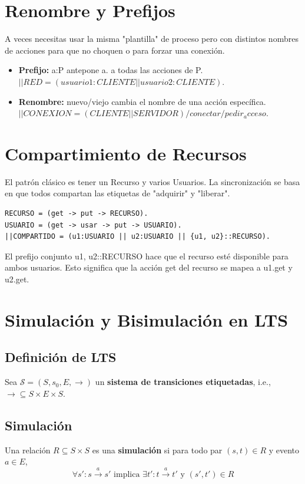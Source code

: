 \documentclass[11pt,a4paper]{article}
\begin{document}
\section{Renombre y Prefijos}
A veces necesitas usar la misma "plantilla" de proceso pero con distintos nombres de acciones para que no choquen o para forzar una conexión.
\begin{itemize}
    \item \textbf{Prefijo:} a:P antepone a. a todas las acciones de P. $||RED = (usuario1:CLIENTE || usuario2:CLIENTE)$.
    \item \textbf{Renombre:} nuevo/viejo cambia el nombre de una acción específica. $||CONEXION = (CLIENTE || SERVIDOR) / {conectar/pedir_acceso}$.
\end{itemize}

\section{Compartimiento de Recursos}
El patrón clásico es tener un Recurso y varios Usuarios. La sincronización se basa en que todos compartan las etiquetas de "adquirir" y "liberar".
\begin{lstlisting}
RECURSO = (get -> put -> RECURSO).
USUARIO = (get -> usar -> put -> USUARIO).
||COMPARTIDO = (u1:USUARIO || u2:USUARIO || {u1, u2}::RECURSO).
\end{lstlisting}

\begin{tcolorbox}[title=Nota sobre el operador ::]
El prefijo conjunto {u1, u2}::RECURSO hace que el recurso esté disponible para ambos usuarios. Esto significa que la acción get del recurso se mapea a u1.get y u2.get.
\end{tcolorbox}

\section{Simulación y Bisimulación en LTS}

\subsection{Definición de LTS}
Sea $\mathcal{S} = (S, s_0, E, \rightarrow)$ un \textbf{sistema de transiciones etiquetadas}, i.e., $\rightarrow \subseteq S \times E \times S$.

\subsection{Simulación}
Una relación $R \subseteq S \times S$ es una \textbf{simulación} si para todo par $(s, t) \in R$ y evento $a \in E$,
\[ \forall s' : s \xrightarrow{a} s' \text{ implica } \exists t' : t \xrightarrow{a} t' \text{ y } (s', t') \in R \]
\end{document}
